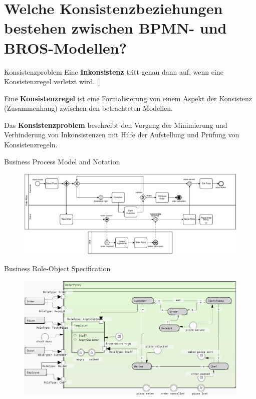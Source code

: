 \section{Welche Konsistenzbeziehungen bestehen zwischen BPMN- und BROS-Modellen?}

\begin{frame}{Konsistenzproblem}
  Eine \textbf{Inkonsistenz} tritt genau dann auf, wenn eine Konsistenzregel verletzt wird. [\cite{Nuseibeh1996}]

  Eine \textbf{Konsistenzregel} ist eine Formalisierung von einem Aspekt der Konsistenz (Zusammenhang) zwischen den betrachteten Modellen.

  Das \textbf{Konsistenzproblem} beschreibt den Vorgang der Minimierung und Verhinderung von Inkonsistenzen mit Hilfe der Aufstellung und Prüfung von Konsistenzregeln.
\end{frame}

\begin{frame}{Business Process Model and Notation}
  \begin{figure}
    \centering
    \begin{adjustbox}{width=1.1\linewidth,center}
      \includegraphics{images/example/bpmn.pdf}
    \end{adjustbox}
  \end{figure}
\end{frame}
\begin{frame}{Business Role-Object Specification}
  \begin{figure}
    \centering
    \begin{adjustbox}{width=0.9\linewidth,center}
      \includegraphics{images/example/bros-rule6.png}
    \end{adjustbox}
  \end{figure}
\end{frame}


